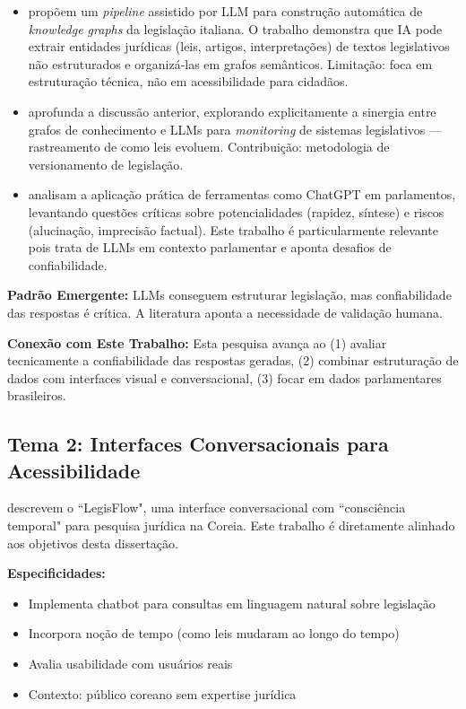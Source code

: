 \begin{itemize}
    \item {} propõem um \textit{pipeline} assistido por LLM para construção automática de \textit{knowledge graphs} da legislação italiana. O trabalho demonstra que IA pode extrair entidades jurídicas (leis, artigos, interpretações) de textos legislativos não estruturados e organizá-las em grafos semânticos. Limitação: foca em estruturação técnica, não em acessibilidade para cidadãos.

    \item {} aprofunda a discussão anterior, explorando explicitamente a sinergia entre grafos de conhecimento e LLMs para \textit{monitoring} de sistemas legislativos — rastreamento de como leis evoluem. Contribuição: metodologia de versionamento de legislação.

    \item {} analisam a aplicação prática de ferramentas como ChatGPT em parlamentos, levantando questões críticas sobre potencialidades (rapidez, síntese) e riscos (alucinação, imprecisão factual). Este trabalho é particularmente relevante pois trata de LLMs em contexto parlamentar e aponta desafios de confiabilidade.
\end{itemize}

\textbf{Padrão Emergente:} LLMs conseguem estruturar legislação, mas confiabilidade das respostas é crítica. A literatura aponta a necessidade de validação humana.

\textbf{Conexão com Este Trabalho:} Esta pesquisa avança ao (1) avaliar tecnicamente a confiabilidade das respostas geradas, (2) combinar estruturação de dados com interfaces visual e conversacional, (3) focar em dados parlamentares brasileiros.

\subsection{Tema 2: Interfaces Conversacionais para Acessibilidade}

 descrevem o ``LegisFlow", uma interface conversacional com ``consciência temporal" para pesquisa jurídica na Coreia. Este trabalho é diretamente alinhado aos objetivos desta dissertação.

\textbf{Especificidades:}

\begin{itemize}
    \item Implementa chatbot para consultas em linguagem natural sobre legislação
    \item Incorpora noção de tempo (como leis mudaram ao longo do tempo)
    \item Avalia usabilidade com usuários reais
    \item Contexto: público coreano sem expertise jurídica
\end{itemize}

